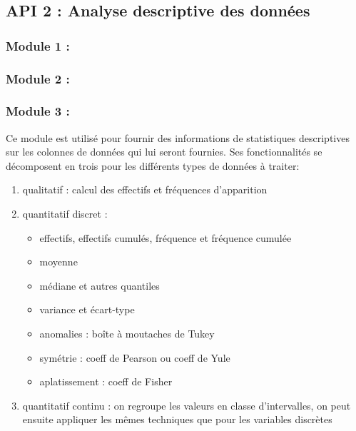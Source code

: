 				
		\subsection{API 2 : Analyse descriptive des données}
				\subsubsection{Module 1 :}
				\subsubsection{Module 2 :}
				\subsubsection{Module 3 :}
				Ce module est utilisé pour fournir des informations de statistiques descriptives sur les colonnes de données qui lui seront fournies. Ses fonctionnalités se décomposent en trois pour les différents types de données à traiter:\\
				\begin{enumerate}
				\item qualitatif : calcul des effectifs et fréquences d'apparition
				\item quantitatif discret :\\
					\begin{itemize}
					\item effectifs, effectifs cumulés, fréquence et fréquence cumulée
					\item moyenne
					\item médiane et autres quantiles
					\item variance et écart-type
					\item anomalies : boîte à moutaches de Tukey
					\item symétrie : coeff de Pearson ou coeff de Yule
					\item aplatissement : coeff de Fisher
					\end{itemize}
				\item quantitatif continu : on regroupe les valeurs en classe d'intervalles, on peut ensuite appliquer les mêmes techniques que pour les variables discrètes
				\end{enumerate}
			
